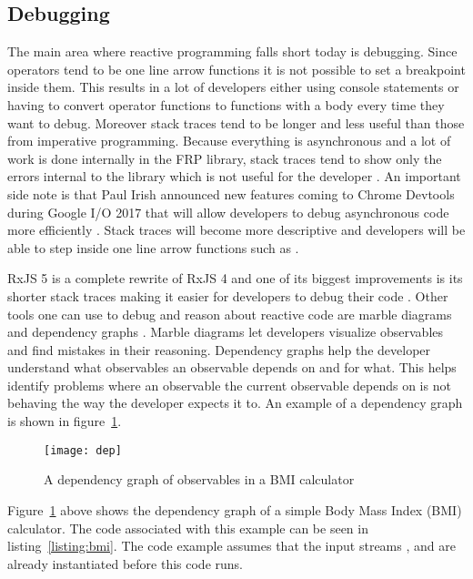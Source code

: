 \subsection{Debugging}

The main area where reactive programming falls short today is debugging. Since operators tend to be one line arrow functions it is not possible to set a breakpoint inside them. This results in a lot of developers either using console statements or having to convert operator functions to functions with a body every time they want to debug. Moreover stack traces tend to be longer and less useful than those from imperative programming. Because everything is asynchronous and a lot of work is done internally in the FRP library, stack traces tend to show only the errors internal to the library which is not useful for the developer \cite{debug}. An important side note is that Paul Irish announced new features coming to Chrome Devtools during Google I/O 2017 that will allow developers to debug asynchronous code more efficiently \cite{devtools}. Stack traces will become more descriptive and developers will be able to step inside one line arrow functions such as  \cite{devtools}.

RxJS 5 is a complete rewrite of RxJS 4 and one of its biggest improvements is its shorter stack traces making it easier for developers to debug their code \cite{debug}. Other tools one can use to debug and reason about reactive code are marble diagrams and dependency graphs \cite{debug}. Marble diagrams let developers visualize observables and find mistakes in their reasoning. Dependency graphs help the developer understand what observables an observable depends on and for what. This helps identify problems where an observable the current observable depends on is not behaving the way the developer expects it to. An example of a dependency graph is shown in figure~\ref{figure:depgraph}.

\begin{figure}[H]
	\centering
	\texttt{[image: dep]}
	\caption{A dependency graph of observables in a BMI calculator \cite{debug}}
	\label{figure:depgraph}
\end{figure}

Figure~\ref{figure:depgraph} above shows the dependency graph of a simple Body Mass Index (BMI) calculator. The code associated with this example can be seen in listing~\ref{listing:bmi}. The code example assumes that the input streams ,  and  are already instantiated before this code runs. 

